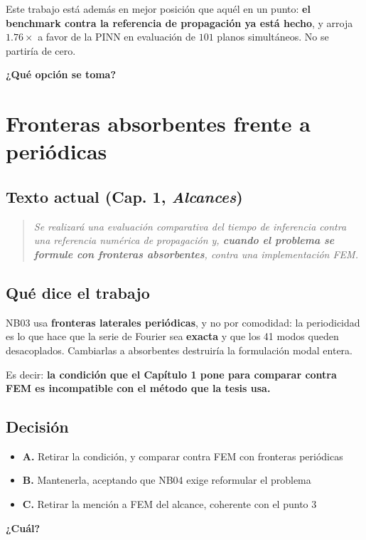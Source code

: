 \documentclass[11pt,a4paper]{article}
\renewcommand{\%}{\char`\%\relax}%
\newcommand{\cita}[1]{%
  \begin{quote}\itshape\color{gris}#1\end{quote}}
\begin{document}
\vspace{0.4em}
\noindent
Este trabajo está además en mejor posición que aquél en un punto: \textbf{el
benchmark contra la referencia de propagación ya está hecho}, y arroja
$1.76\times$ a favor de la PINN en evaluación de $101$ planos simultáneos. No se
partiría de cero.

\vspace{0.3em}
\noindent
\textbf{¿Qué opción se toma?}

\section{Fronteras absorbentes frente a periódicas}

\subsection{Texto actual (Cap. 1, \textit{Alcances})}
\cita{Se realizará una evaluación comparativa del tiempo de inferencia contra
una referencia numérica de propagación y, \textbf{cuando el problema se formule
con fronteras absorbentes}, contra una implementación FEM.}

\subsection{Qué dice el trabajo}
NB03 usa \textbf{fronteras laterales periódicas}, y no por comodidad: la
periodicidad es lo que hace que la serie de Fourier sea \textbf{exacta} y que
los 41 modos queden desacoplados. Cambiarlas a absorbentes destruiría la
formulación modal entera.

Es decir: \textbf{la condición que el Capítulo 1 pone para comparar contra FEM
es incompatible con el método que la tesis usa.}

\subsection{Decisión}
\begin{itemize}
  \item \textbf{A.} Retirar la condición, y comparar contra FEM con fronteras
  periódicas
  \item \textbf{B.} Mantenerla, aceptando que NB04 exige reformular el problema
  \item \textbf{C.} Retirar la mención a FEM del alcance, coherente con el
  punto 3
\end{itemize}

\noindent
\textbf{¿Cuál?}
\end{document}
